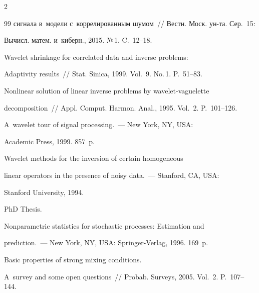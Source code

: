 \begin{multicols}{2}
{{\begin{thebibliography}{99}
сигнала в~модели с~коррелированным шумом~// Вестн. Моск. ун-та. Сер.~15: 

Вычисл. матем. и~киберн., 2015. №\,1. C.~12--18.








 Wavelet shrinkage for correlated data and inverse problems: 

Adaptivity results~// Stat. Sinica, 1999. Vol.~9. No.\,1. P.~51--83.




 Nonlinear solution of linear inverse problems by wavelet-vaguelette 

decomposition~// Appl. Comput. Harmon. Anal., 1995. Vol.~2. P.~101--126.




 A~wavelet tour of signal processing.~--- New York, NY, USA:

Academic Press, 1999. 857~p.




 Wavelet methods for the inversion of certain homogeneous 

linear operators in the presence of noisy data.~--- Stanford, CA, USA:

Stanford University, 1994.

 PhD Thesis.




 Nonparametric statistics for stochastic processes: Estimation and 

prediction.~--- New York, NY, USA: Springer-Verlag, 1996. 169~p.




 Basic properties of strong mixing conditions. 

A~survey and some open questions~// Probab. Surveys, 2005. Vol.~2. P.~107--144.



 \end{thebibliography}



 }

 }



\end{multicols}




